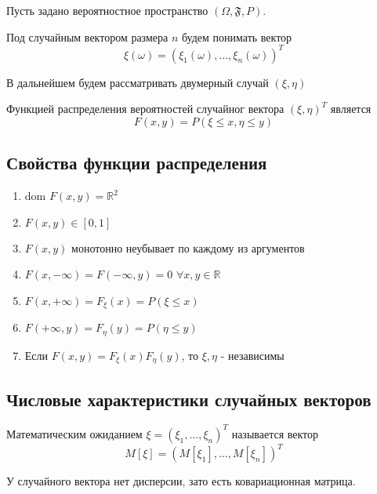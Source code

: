 Пусть задано вероятностное пространство $(\Omega, \mathfrak{F}, P)$.

\begin{definition}
    Под случайным вектором размера $n$ будем понимать вектор
$$
\xi(\omega) = (\xi_1(\omega), \ldots, \xi_n(\omega))^T
$$
\end{definition}

\begin{remark}
    В дальнейшем будем рассматривать двумерный случай $(\xi,\eta)$
\end{remark}

\begin{definition}
    Функцией распределения вероятностей случайног вектора $(\xi, \eta)^T$ является
$$
F(x, y) = P(\xi \le x, \eta \le y)
$$
\end{definition}

\subsection{Свойства функции распределения}
\begin{enumerate}
    \item dom $F(x, y) = \mathbb{R}^2$
    \item $F(x, y) \in [0, 1]$
    \item $F(x, y)$ монотонно неубывает по каждому из аргументов
    \item $F(x, -\infty) = F(-\infty, y) = 0$ $\forall x,y \in \mathbb{R}$
    \item $F(x, +\infty) = F_\xi(x) = P(\xi \le x)$
    \item $F(+\infty, y) = F_\eta(y) = P(\eta \le y)$
    \item Если $F(x, y) = F_\xi(x)F_\eta(y)$, то $\xi,\eta$ - независимы
\end{enumerate}

\subsection{Числовые характеристики случайных векторов}
\begin{definition}
    Математическим ожиданием $\xi = (\xi_1, \ldots, \xi_n)^T$ называется вектор
$$
    M[\xi] = (M[\xi_1], \ldots, M[\xi_n])^T
$$
\end{definition}

\begin{remark}
У случайного вектора нет дисперсии, зато есть ковариационная матрица.
\end{remark}

